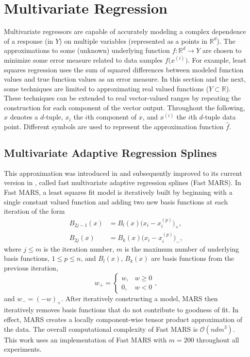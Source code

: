 \section{Multivariate Regression}
\label{sec:regression}
Multivariate regressors are capable of accurately modeling a complex
dependence of a response (in $Y$) on multiple variables (represented
as a points in $\mathbb{R}^{d}$). The approximations to some (unknown)
underlying function $f: \mathbb{R}^d \rightarrow Y$ are chosen to
minimize some error measure related to data samples
$f\bigl(x^{(i)}\bigr)$. For example, least squares regression uses the
sum of squared differences between modeled function values and true
function values as an error measure. In this section and the next,
some techniques are limited to approximating real valued functions ($Y
\subset \mathbb{R}$). These techniques can be extended to real
vector-valued ranges by repeating the construction for each component
of the vector output. Throughout the following, $x$ denotes a
$d$-tuple, $x_i$ the $i$th component of $x$, and $x^{(i)}$ the $i$th
$d$-tuple data point. Different symbols are used to represent the
approximation function $\hat f$.

\subsection{Multivariate Adaptive Regression Splines}
\label{sec:mars}
This approximation was introduced in \cite{friedman1991multivariate}
and subsequently improved to its current version in
\cite{stanford1993fast}, called fast multivariate adaptive regression
splines (Fast MARS). In Fast MARS, a least squares fit model is
iteratively built by beginning with a single constant valued function
and adding two new basis functions at each iteration of the form
\begin{align*}
  B_{2j-1}(x) &= B_l(x) \bigl(x_i-x^{(p)}_i\bigr)_+, \\
  B_{2j}(x) &= B_k(x) \bigl(x_i-x^{(p)}_i\bigr)_- ,
\end{align*}
where $j \leq m$ is the iteration number, $m$ is the maximum
  number of underlying basis functions, $1 \le p \le n$, and
$B_l(x)$, $B_k(x)$ are basis functions from the previous iteration,
 $$w_+ = \begin{cases} w, & w \geq 0 \\ 0, & w < 0 \end{cases},$$ and
$w_- = (-w)_+$. After iteratively constructing a model, MARS then
iteratively removes basis functions that do not contribute to goodness
of fit. In effect, MARS creates a locally component-wise tensor
product approximation of the data. The overall computational
complexity of Fast MARS is $\mathcal{O}(n d m^3)$. This work
uses an implementation of Fast MARS \cite{rudy2017pyearth} with $m =
200$ throughout all experiments.

